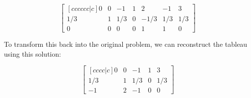 \documentclass[12pt]{extarticle}
\theoremstyle{definition}
\begin{document}
\begin{problem}
\begin{description}
		$$\begin{bmatrix}[cccccc|c] 0&0&-1&1&2&-1&3\\ 1/3&1&1/3&0&-1/3&1/3&1/3\\ 0&0&0&0&1&1&0 \end{bmatrix}$$

		To transform this back into the original problem, we can reconstruct the tableau using this solution:

		$$\begin{bmatrix}[cccc|c] 0&0&-1&1&3\\ 1/3&1&1/3&0&1/3\\ -1&2&-1&0&0 \end{bmatrix}$$

	\end{description}

\end{problem}
\end{document}
